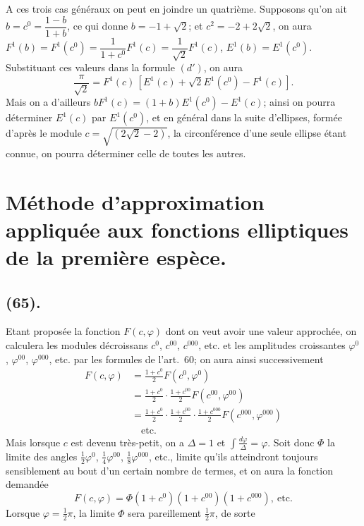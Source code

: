 \documentclass{article}
\begin{document}

A ces trois cas généraux on peut en joindre un quatrième. Supposons qu'on ait $b=c^{0}=\dfrac{1-b}{1+b}$, ce qui donne $b=-1+\sqrt{2}$; et $c^{2}=-2+2\sqrt{2}$, on aura $F^{1}(b)=F^{1}(c^{0})=\dfrac{1}{1+c^{0}}F^{1}(c)=\dfrac{1}{\sqrt{2}}F^{1}(c)$, $E^{1}(b)=E^{1}(c^{0})$. Substituant ces valeurs dans la formule $(d')$, on aura
\[ \frac{\pi}{\sqrt{2}}=F^{1}(c)\,[E^{1}(c)+\sqrt{2}E^{1}(c^{0})-F^{1}(c)]. \]
Mais on a d'ailleurs $bF^{1}(c)=(1+b)E^{1}(c^{0})-E^{1}(c)$; ainsi on pourra déterminer $E^{1}(c)$ par $E^{1}(c^{0})$, et en général dans la suite d'ellipses, formée d'après le module $c=\sqrt{(2\sqrt{2}-2)}$, la circonférence d'une seule ellipse étant connue, on pourra déterminer celle de toutes les autres.

\section*{Méthode d'approximation appliquée aux fonctions elliptiques de la première espèce.}

\subsection*{(65).}

Etant proposée la fonction $F(c,\varphi)$ dont on veut avoir une valeur approchée, on calculera les modules décroissans $c^{0}$, $c^{00}$, $c^{000}$, etc. et les amplitudes croissantes $\varphi^{0}$, $\varphi^{00}$, $\varphi^{000}$, etc. par les formules de l'art.~60; on aura ainsi successivement
\[ \begin{aligned} F(c,\varphi)&=\frac{1+c^{0}}{2}F(c^{0},\varphi^{0})\\ &=\frac{1+c^{0}}{2}\cdot\frac{1+c^{00}}{2}F(c^{00},\varphi^{00})\\ &=\frac{1+c^{0}}{2}\cdot\frac{1+c^{00}}{2}\cdot\frac{1+c^{000}}{2}F(c^{000},\varphi^{000})\\ &\quad\text{etc.} \end{aligned} \]
Mais lorsque $c$ est devenu très-petit, on a $\Delta=1$ et $\displaystyle\int\frac{d\varphi}{\Delta}=\varphi$. Soit donc $\Phi$ la limite des angles $\frac{1}{2}\varphi^{0}$, $\frac{1}{4}\varphi^{00}$, $\frac{1}{8}\varphi^{000}$, etc., limite qu'ils atteindront toujours sensiblement au bout d'un certain nombre de termes, et on aura la fonction demandée
\[ F(c,\varphi)=\Phi(1+c^{0})(1+c^{00})(1+c^{000}),\ \text{etc.} \]
Lorsque $\varphi=\frac{1}{2}\pi$, la limite $\Phi$ sera pareillement $\frac{1}{2}\pi$, de sorte
\end{document}
